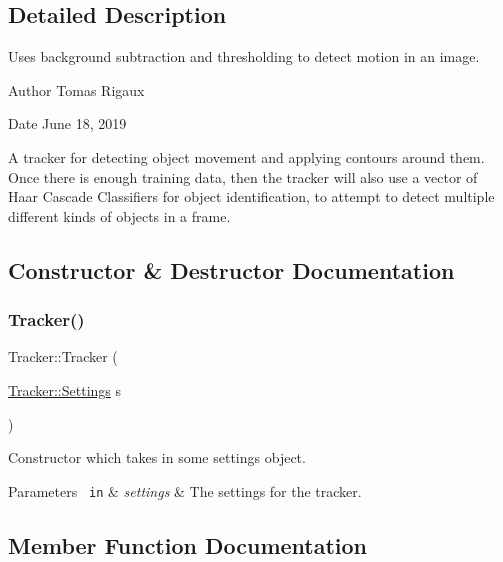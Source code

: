 \subsection{Detailed Description}
Uses background subtraction and thresholding to detect motion in an image. 

\begin{DoxyAuthor}{Author}
Tomas Rigaux 
\end{DoxyAuthor}
\begin{DoxyDate}{Date}
June 18, 2019
\end{DoxyDate}
A tracker for detecting object movement and applying contours around them. Once there is enough training data, then the tracker will also use a vector of Haar Cascade Classifiers for object identification, to attempt to detect multiple different kinds of objects in a frame. 

\subsection{Constructor \& Destructor Documentation}
\mbox{\label{class_tracker_ae21ec1606548b5b8de682e29734743fd}} 
\subsubsection{\texorpdfstring{Tracker()}{Tracker()}}
{\footnotesize\ttfamily Tracker\+::\+Tracker (\begin{DoxyParamCaption}\item[{\mbox{\hyperlink{struct_tracker_1_1_settings}{Tracker\+::\+Settings}}}]{s }\end{DoxyParamCaption})}

Constructor which takes in some settings object. 
\begin{DoxyParams}[1]{Parameters}
\mbox{\texttt{ in}}  & {\em settings} & The settings for the tracker. \\
\hline
\end{DoxyParams}


\subsection{Member Function Documentation}
\mbox{\label{class_tracker_a4213b47312e51570ecbd744f7c1f6995}} 
